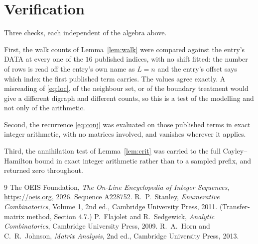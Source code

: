 \documentclass[11pt,a4paper]{article}
\theoremstyle{plain}
\theoremstyle{definition}
\begin{document}
\section{Verification}

Three checks, each independent of the algebra above.

First, the walk counts of Lemma~\ref{lem:walk} were compared against the entry's DATA at
every one of the $16$ published indices, with no shift fitted: the number of rows is
read off the entry's own name as $L=n$ and the entry's offset says which index the first
published term carries. The values agree exactly. A misreading of \eqref{eq:loc}, of the
neighbour set, or of the boundary treatment would give a different digraph and different
counts, so this is a test of the modelling and not only of the arithmetic.

Second, the recurrence \eqref{eq:conj} was evaluated on those published terms in exact
integer arithmetic, with no matrices involved, and vanishes wherever it applies.

Third, the annihilation test of Lemma~\ref{lem:crit} was carried to the full
Cayley--Hamilton bound in exact integer arithmetic rather than to a sampled prefix, and
returned zero throughout.

\begin{thebibliography}{9}
 The OEIS Foundation, \emph{The On-Line Encyclopedia of Integer
Sequences}, \url{https://oeis.org}, 2026. Sequence A228752.
 R.~P.~Stanley, \emph{Enumerative Combinatorics}, Volume 1, 2nd ed.,
Cambridge University Press, 2011. (Transfer-matrix method, Section 4.7.)
 P.~Flajolet and R.~Sedgewick, \emph{Analytic Combinatorics}, Cambridge
University Press, 2009.
 R.~A.~Horn and C.~R.~Johnson, \emph{Matrix Analysis}, 2nd ed., Cambridge
University Press, 2013.
\end{thebibliography}
\end{document}
